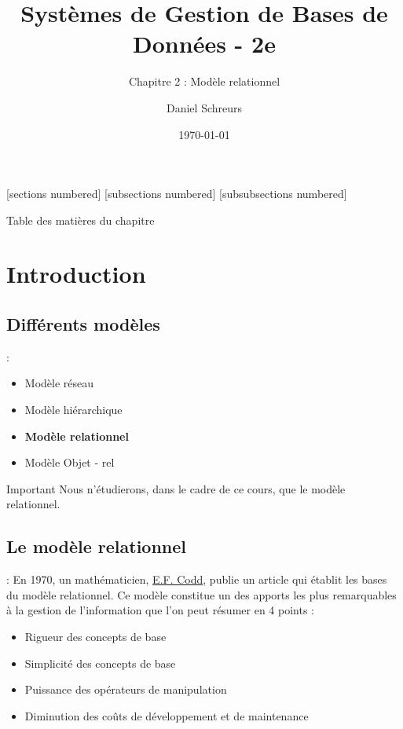\documentclass[10pt]{beamer}
\title{Systèmes de Gestion de Bases de Données - 2e}
\subtitle{Chapitre 2 : Modèle relationnel}
\date{\today}
\author{Daniel Schreurs}
\institute{Haute École de Province de Liège}
\begin{document}
\maketitle

[sections numbered]
[subsections numbered]
[subsubsections numbered]
\begin{frame}[allowframebreaks]{Table des matières du chapitre}
    \tableofcontents[subsectionstyle=show/show/hide,subsubsectionstyle=show/show/hide,]
\end{frame}

\section{Introduction}
\tocss

\subsection{Différents modèles}
\begin{frame}{\secname : \subsecname}
    \begin{itemize}
        \item Modèle réseau
        \item Modèle hiérarchique
        \item \textbf{Modèle relationnel}
        \item Modèle Objet - rel
    \end{itemize}
    \begin{alertblock}{Important}
        Nous n'étudierons, dans le cadre de ce cours, que le modèle relationnel.
    \end{alertblock}
\end{frame}

\subsection{Le modèle relationnel}
\begin{frame}{\secname : \subsecname}
    En 1970, un mathématicien, \href{https://fr.wikipedia.org/wiki/Edgar_Frank_Codd}{E.F. Codd}, publie un article qui établit les bases du modèle relationnel.
    Ce modèle constitue un des apports les plus remarquables à la gestion de l’information que l’on peut résumer en 4 points :
    \begin{itemize}
        \item Rigueur des concepts de base
        \item Simplicité des concepts de base
        \item Puissance des opérateurs de manipulation
        \item Diminution des coûts de développement et de maintenance
    \end{itemize}
\end{frame}
\end{document}
